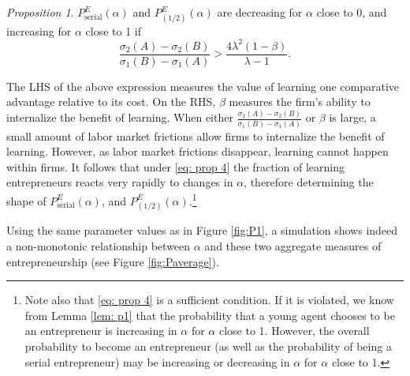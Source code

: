 \documentclass[12pt,american]{paper}
\theoremstyle{remark}
\newtheorem{prop}{Proposition}
\begin{document}
\begin{prop}\label{prop:probability-of-entrepreneurship}
$P_{\mbox{serial}}^E(\alpha)$ and  $P_{(1/2)}^E(\alpha)$ are decreasing for $\alpha$ close to 0, and increasing for $\alpha$ close to 1 if 
\begin{equation}\label{eq: prop 4}
\frac{ \sigma_2(A)- \sigma_2(B)}{ \sigma_1(B)- \sigma_1(A)}>\frac{4 \lambda^2 (1-\beta)}{\lambda -1}.
\end{equation}
\end{prop}
The LHS of the above expression measures the value of learning one comparative advantage relative to its cost. On the RHS, $\beta$ measures the firm's ability to internalize the benefit of learning. When either $\frac{ \sigma_2(A)- \sigma_2(B)}{ \sigma_1(B)- \sigma_1(A)}$ or $\beta$ is large, a small amount of labor market frictions allow firms to internalize the benefit of learning. However, as labor market frictions disappear, learning cannot happen within firms. It follows that under \eqref{eq: prop 4} the fraction of learning entrepreneurs reacts very rapidly to changes in $\alpha$, therefore determining the shape of $P_{\mbox{serial}}^E (\alpha)$, and $P_{(1/2)}^E(\alpha)$.\footnote{Note also that \eqref{eq: prop 4} is a sufficient condition. If it is violated, we know from Lemma \ref{lem: p1} that the probability that a young agent chooses to be an entrepreneur is increasing in $\alpha$ for $\alpha$ close to 1. However, the overall probability to become an entrepreneur (as well as the probability of being a serial entrepreneur) may be increasing or decreasing in  $\alpha$ for $\alpha$ close to 1.}

Using the same parameter values as in Figure \ref{fig:P1}, a simulation shows indeed a non-monotonic relationship between $\alpha$ and these two aggregate measures of entrepreneurship (see Figure \ref{fig:Paverage}).
\end{document}
